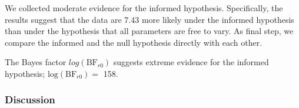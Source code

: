 \documentclass[
  english,
  man,floatsintext]{apa6}
\newenvironment{Shaded}{\begin{snugshade}}{\end{snugshade}}
\newcommand{\CommentTok}[1]{\textcolor[rgb]{0.56,0.35,0.01}{\textit{#1}}}
\newcommand{\DataTypeTok}[1]{\textcolor[rgb]{0.13,0.29,0.53}{#1}}
\newcommand{\DecValTok}[1]{\textcolor[rgb]{0.00,0.00,0.81}{#1}}
\newcommand{\KeywordTok}[1]{\textcolor[rgb]{0.13,0.29,0.53}{\textbf{#1}}}
\newcommand{\NormalTok}[1]{#1}
\newcommand{\OperatorTok}[1]{\textcolor[rgb]{0.81,0.36,0.00}{\textbf{#1}}}
\newcommand{\StringTok}[1]{\textcolor[rgb]{0.31,0.60,0.02}{#1}}
\begin{document}
\begin{Shaded}
\end{Shaded}

We collected moderate evidence for the informed
hypothesis. Specifically, the results suggest that the data
are 7.43 more likely under
the informed hypothesis than under the hypothesis that all parameters are
free to vary. As final step, we compare the informed and the null hypothesis directly
with each other.

\begin{Shaded}
\end{Shaded}

The Bayes factor \(log(\text{BF}_{r0})\) suggests extreme evidence for the informed hypothesis; \(\text{log}(\text{BF}_{r0}) =\) 158.

\hypertarget{discussion-1}{%
\subsubsection{Discussion}\label{discussion-1}}
\end{document}
